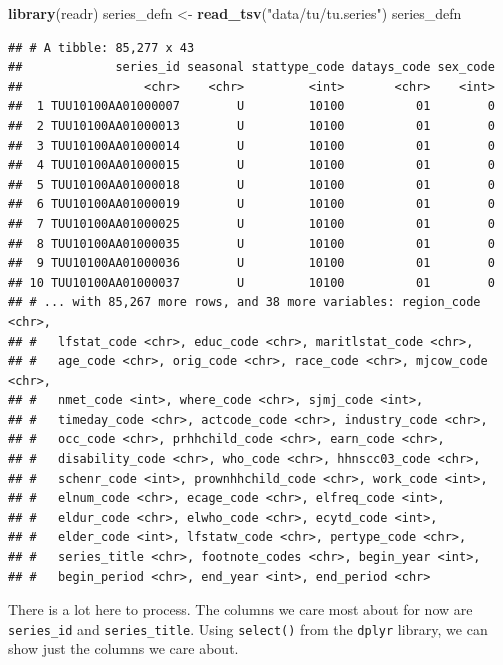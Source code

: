 \documentclass[]{book}
\newenvironment{Shaded}{\begin{snugshade}}{\end{snugshade}}
\newcommand{\KeywordTok}[1]{\textcolor[rgb]{0.13,0.29,0.53}{\textbf{{#1}}}}
\newcommand{\StringTok}[1]{\textcolor[rgb]{0.31,0.60,0.02}{{#1}}}
\newcommand{\NormalTok}[1]{{#1}}
\theoremstyle{definition}
\theoremstyle{definition}
\theoremstyle{remark}
\begin{document}
\begin{Shaded}
\begin{Highlighting}[]
\KeywordTok{library}\NormalTok{(readr)}
\NormalTok{series_defn <-}\StringTok{ }\KeywordTok{read_tsv}\NormalTok{(}\StringTok{"data/tu/tu.series"}\NormalTok{)}
\NormalTok{series_defn}
\end{Highlighting}
\end{Shaded}

\begin{verbatim}
## # A tibble: 85,277 x 43
##             series_id seasonal stattype_code datays_code sex_code
##                 <chr>    <chr>         <int>       <chr>    <int>
##  1 TUU10100AA01000007        U         10100          01        0
##  2 TUU10100AA01000013        U         10100          01        0
##  3 TUU10100AA01000014        U         10100          01        0
##  4 TUU10100AA01000015        U         10100          01        0
##  5 TUU10100AA01000018        U         10100          01        0
##  6 TUU10100AA01000019        U         10100          01        0
##  7 TUU10100AA01000025        U         10100          01        0
##  8 TUU10100AA01000035        U         10100          01        0
##  9 TUU10100AA01000036        U         10100          01        0
## 10 TUU10100AA01000037        U         10100          01        0
## # ... with 85,267 more rows, and 38 more variables: region_code <chr>,
## #   lfstat_code <chr>, educ_code <chr>, maritlstat_code <chr>,
## #   age_code <chr>, orig_code <chr>, race_code <chr>, mjcow_code <chr>,
## #   nmet_code <int>, where_code <chr>, sjmj_code <int>,
## #   timeday_code <chr>, actcode_code <chr>, industry_code <chr>,
## #   occ_code <chr>, prhhchild_code <chr>, earn_code <chr>,
## #   disability_code <chr>, who_code <chr>, hhnscc03_code <chr>,
## #   schenr_code <int>, prownhhchild_code <chr>, work_code <int>,
## #   elnum_code <chr>, ecage_code <chr>, elfreq_code <int>,
## #   eldur_code <chr>, elwho_code <chr>, ecytd_code <int>,
## #   elder_code <int>, lfstatw_code <chr>, pertype_code <chr>,
## #   series_title <chr>, footnote_codes <chr>, begin_year <int>,
## #   begin_period <chr>, end_year <int>, end_period <chr>
\end{verbatim}

There is a lot here to process. The columns we care most about for now
are \texttt{series\_id} and \texttt{series\_title}. Using
\texttt{select()} from the \texttt{dplyr} library, we can show just the
columns we care about.

\begin{Shaded}
\end{Shaded}
\end{document}
